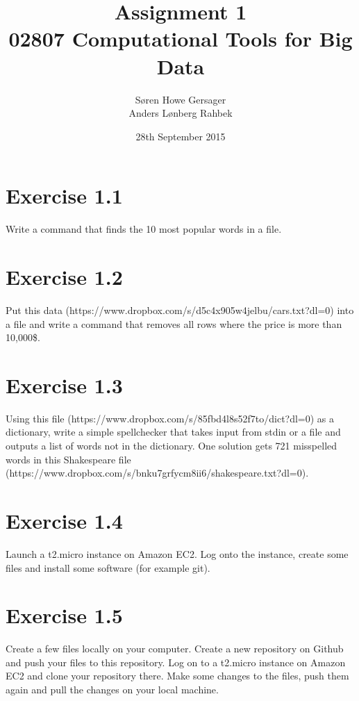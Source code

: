 \documentclass{article}
\title{Assignment 1\\02807 Computational Tools for Big Data}
\author{Søren Howe Gersager \\Anders Lønberg Rahbek}
\date{28th September 2015}
\begin{document}
\maketitle
\newpage
\section{Exercise 1.1}
Write a command that finds the 10 most popular words in a file.


\section{Exercise 1.2}
Put this data (https://www.dropbox.com/s/d5c4x905w4jelbu/cars.txt?dl=0) into a file and write a command that removes all rows where the price is more than 10,000\$.

%



\section{Exercise 1.3}
Using this file (https://www.dropbox.com/s/85fbd4l8s52f7to/dict?dl=0) as a dictionary, write a simple spellchecker that takes input from stdin or a file and outputs a list of words not in the dictionary. One solution gets 721 misspelled words in this Shakespeare file (https://www.dropbox.com/s/bnku7grfycm8ii6/shakespeare.txt?dl=0).




\section{Exercise 1.4}
Launch a t2.micro instance on Amazon EC2. Log onto the instance, create some files and install some software (for example git).
\section{Exercise 1.5}
Create a few files locally on your computer. Create a new repository on Github and push your files to this repository. Log on to a t2.micro instance on Amazon EC2 and clone your repository there. Make some changes to the files, push them again and pull the changes on your local machine.
\end{document}
